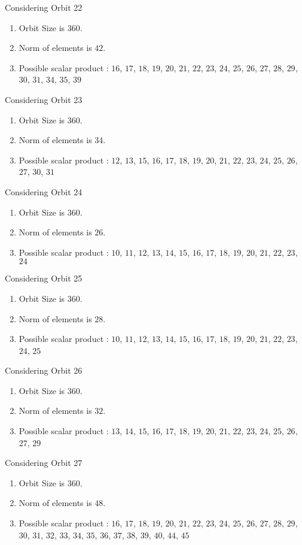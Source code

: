 \documentclass[12pt]{article}
\begin{document}
Considering Orbit 22
\begin{enumerate}
\item Orbit Size is $360$.
\item Norm of elements is $42$.
\item Possible scalar product : $16$, $17$, $18$, $19$, $20$, $21$, $22$, $23$, $24$, $25$, $26$, $27$, $28$, $29$, $30$, $31$, $34$, $35$, $39$
\end{enumerate}
Considering Orbit 23
\begin{enumerate}
\item Orbit Size is $360$.
\item Norm of elements is $34$.
\item Possible scalar product : $12$, $13$, $15$, $16$, $17$, $18$, $19$, $20$, $21$, $22$, $23$, $24$, $25$, $26$, $27$, $30$, $31$
\end{enumerate}
Considering Orbit 24
\begin{enumerate}
\item Orbit Size is $360$.
\item Norm of elements is $26$.
\item Possible scalar product : $10$, $11$, $12$, $13$, $14$, $15$, $16$, $17$, $18$, $19$, $20$, $21$, $22$, $23$, $24$
\end{enumerate}
Considering Orbit 25
\begin{enumerate}
\item Orbit Size is $360$.
\item Norm of elements is $28$.
\item Possible scalar product : $10$, $11$, $12$, $13$, $14$, $15$, $16$, $17$, $18$, $19$, $20$, $21$, $22$, $23$, $24$, $25$
\end{enumerate}
Considering Orbit 26
\begin{enumerate}
\item Orbit Size is $360$.
\item Norm of elements is $32$.
\item Possible scalar product : $13$, $14$, $15$, $16$, $17$, $18$, $19$, $20$, $21$, $22$, $23$, $24$, $25$, $26$, $27$, $29$
\end{enumerate}
Considering Orbit 27
\begin{enumerate}
\item Orbit Size is $360$.
\item Norm of elements is $48$.
\item Possible scalar product : $16$, $17$, $18$, $19$, $20$, $21$, $22$, $23$, $24$, $25$, $26$, $27$, $28$, $29$, $30$, $31$, $32$, $33$, $34$, $35$, $36$, $37$, $38$, $39$, $40$, $44$, $45$
\end{enumerate}
\end{document}
